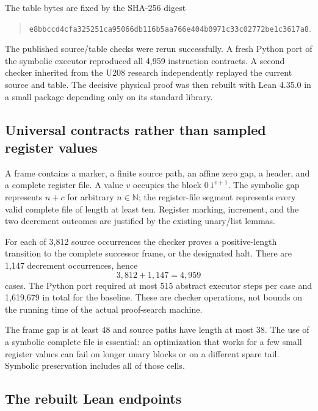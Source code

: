 \documentclass[11pt,letterpaper]{article}
\begin{document}
The table bytes are fixed by the SHA-256 digest
\begin{quote}\small
\nolinkurl{e8bbccd4cfa325251ca95066db116b5aa766e404b0971c33c02772be1c3617a8}.
\end{quote}
The published source/table checks were rerun successfully. A fresh Python
port of the symbolic executor reproduced all 4,959 instruction contracts.
A second checker inherited from the U208 research independently replayed
the current source and table. The decisive physical proof was then rebuilt
with Lean 4.35.0 in a small package depending only on its standard library.

\subsection{Universal contracts rather than sampled register values}

A frame contains a marker, a finite source path, an affine zero gap, a
header, and a complete register file. A value $v$ occupies the block
$0\,1^{v+1}$. The symbolic gap represents $n+c$ for arbitrary
$n\in\mathbb N$; the register-file segment represents every valid complete
file of length at least ten. Register marking, increment, and the two
decrement outcomes are justified by the existing unary/list lemmas.

For each of 3,812 source occurrences the checker proves a positive-length
transition to the complete successor frame, or the designated halt.
There are 1,147 decrement occurrences, hence
\[
 3,812+1,147=4,959
\]
cases. The Python port required at most 515 abstract executor steps per
case and 1,619,679 in total for the baseline. These are checker operations,
not bounds on the running time of the actual proof-search machine.

The frame gap is at least 48 and source paths have length at most 38.
The use of a symbolic complete file is essential: an optimization that
works for a few small register values can fail on longer unary blocks or
on a different spare tail. Symbolic preservation includes all of those
cells.

\subsection{The rebuilt Lean endpoints}
\end{document}
